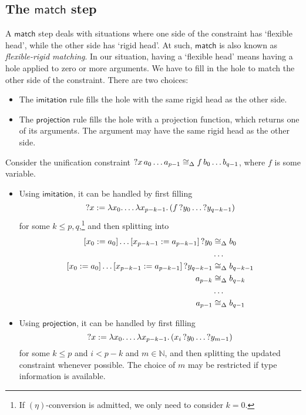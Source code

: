 \documentclass[twoside]{report}
\begin{document}
\subsection*{The $\mathsf{match}$ step}

A $\mathsf{match}$ step deals with situations where one side of the constraint has `flexible head', while the other side has `rigid head'. At such, $\mathsf{match}$ is also known as \emph{flexible-rigid matching}. In our situation, having a `flexible head' means having a hole applied to zero or more arguments. We have to fill in the hole to match the other side of the constraint. There are two choices:

\begin{itemize}[noitemsep]
    \item The $\mathsf{imitation}$ rule fills the hole with the same rigid head as the other side.
    \item The $\mathsf{projection}$ rule fills the hole with a projection function, which returns one of its arguments. The argument may have the same rigid head as the other side.
\end{itemize}

\begin{example}
Consider the unification constraint ${{{?x}\,{a_0}}\,{\ldots}}\,{a_{p-1}} \cong_\Delta {{{f}\,{b_0}}\,{\ldots}}\,{b_{q-1}}$, where $f$ is some variable.

\begin{itemize}
    \item Using $\mathsf{imitation}$, it can be handled by first filling
    $$
    {?x} :=
        \lambda{x_0}.\,{\ldots \lambda{x_{p-k-1}}.\,{
            ({{f}\,{?y_0}}\,{\ldots {?y_{q-k-1}}})
        }}
    $$
    for some $k \leq p,q$,\footnote{If $(\eta)$-conversion is admitted, we only need to consider $k = 0$.} and then splitting into
    $$
    \begin{aligned}
    \llet {x_0} {a_0} {\ldots \llet {x_{p-k-1}} {a_{p-k-1}} {?y_0}} &\cong_\Delta b_0 \\
      & \ldots \\
    \llet {x_0} {a_0} {\ldots \llet {x_{p-k-1}} {a_{p-k-1}} {?y_{q-k-1}}} &\cong_\Delta b_{q-k-1} \\
    a_{p-k} &\cong_\Delta b_{q-k} \\
      & \ldots \\
    a_{p-1} &\cong_\Delta b_{q-1} \\
    \end{aligned}
    $$

    \item Using $\mathsf{projection}$, it can be handled by first filling
    $$
    {?x} :=
        \lambda{x_0}.\,{\ldots \lambda{x_{p-k-1}}.\,{
            ({{x_i}\,{?y_0}}\,{\ldots {?y_{m-1}}})
        }}
    $$
    for some $k \leq p$ and $i < p - k$ and $m \in \mathbb N$, and then splitting the updated constraint whenever possible. The choice of $m$ may be restricted if type information is available.
\end{itemize}
\end{example}
\end{document}

